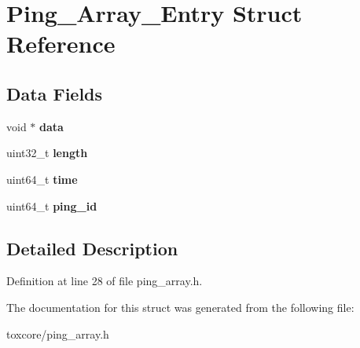 \hypertarget{struct_ping___array___entry}{\section{Ping\+\_\+\+Array\+\_\+\+Entry Struct Reference}
\label{struct_ping___array___entry}
}
\subsection*{Data Fields}
\begin{DoxyCompactItemize}
\item 
\hypertarget{struct_ping___array___entry_a735984d41155bc1032e09bece8f8d66d}{void $\ast$ {\bfseries data}}\label{struct_ping___array___entry_a735984d41155bc1032e09bece8f8d66d}

\item 
\hypertarget{struct_ping___array___entry_aebb70c2aab3407a9f05334c47131a43b}{uint32\+\_\+t {\bfseries length}}\label{struct_ping___array___entry_aebb70c2aab3407a9f05334c47131a43b}

\item 
\hypertarget{struct_ping___array___entry_a5d34a8f2dfe25421b2b473a5fd37b0ed}{uint64\+\_\+t {\bfseries time}}\label{struct_ping___array___entry_a5d34a8f2dfe25421b2b473a5fd37b0ed}

\item 
\hypertarget{struct_ping___array___entry_acec02fbdff648ca71a6d8e5a0d63d634}{uint64\+\_\+t {\bfseries ping\+\_\+id}}\label{struct_ping___array___entry_acec02fbdff648ca71a6d8e5a0d63d634}

\end{DoxyCompactItemize}


\subsection{Detailed Description}


Definition at line 28 of file ping\+\_\+array.\+h.



The documentation for this struct was generated from the following file\+:\begin{DoxyCompactItemize}
\item 
toxcore/ping\+\_\+array.\+h\end{DoxyCompactItemize}
